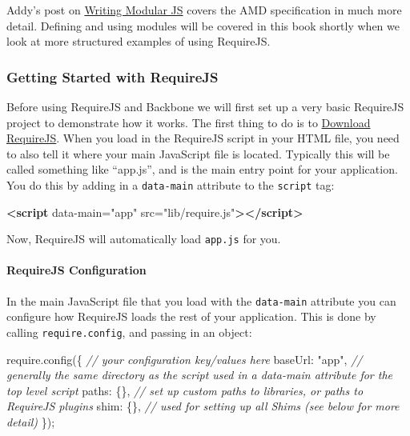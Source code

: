 \documentclass[9pt]{book}
\newenvironment{Shaded}{}{}
\newcommand{\KeywordTok}[1]{\textcolor[rgb]{0.00,0.44,0.13}{\textbf{{#1}}}}
\newcommand{\DataTypeTok}[1]{\textcolor[rgb]{0.56,0.13,0.00}{{#1}}}
\newcommand{\StringTok}[1]{\textcolor[rgb]{0.25,0.44,0.63}{{#1}}}
\newcommand{\CommentTok}[1]{\textcolor[rgb]{0.38,0.63,0.69}{\textit{{#1}}}}
\newcommand{\OtherTok}[1]{\textcolor[rgb]{0.00,0.44,0.13}{{#1}}}
\newcommand{\FunctionTok}[1]{\textcolor[rgb]{0.02,0.16,0.49}{{#1}}}
\newcommand{\NormalTok}[1]{{#1}}
\begin{document}
Addy's post on \href{http://addyosmani.com/writing-modular-js/}{Writing
Modular JS} covers the AMD specification in much more detail. Defining
and using modules will be covered in this book shortly when we look at
more structured examples of using RequireJS.

\subsubsection{Getting Started with
RequireJS}\label{getting-started-with-requirejs}

Before using RequireJS and Backbone we will first set up a very basic
RequireJS project to demonstrate how it works. The first thing to do is
to \href{http://requirejs.org/docs/download.html\#requirejs}{Download
RequireJS}. When you load in the RequireJS script in your HTML file, you
need to also tell it where your main JavaScript file is located.
Typically this will be called something like ``app.js'', and is the main
entry point for your application. You do this by adding in a
\texttt{data-main} attribute to the \texttt{script} tag:

\begin{Shaded}
\begin{Highlighting}[]
\KeywordTok{<script}\OtherTok{ data-main=}\StringTok{"app"}\OtherTok{ src=}\StringTok{"lib/require.js"}\KeywordTok{></script>}
\end{Highlighting}
\end{Shaded}

Now, RequireJS will automatically load \texttt{app.js} for you.

\paragraph{RequireJS Configuration}\label{requirejs-configuration}

In the main JavaScript file that you load with the \texttt{data-main}
attribute you can configure how RequireJS loads the rest of your
application. This is done by calling \texttt{require.config}, and
passing in an object:

\begin{Shaded}
\begin{Highlighting}[]
\OtherTok{require}\NormalTok{.}\FunctionTok{config}\NormalTok{(\{}
    \CommentTok{// your configuration key/values here}
    \DataTypeTok{baseUrl}\NormalTok{: }\StringTok{"app"}\NormalTok{, }\CommentTok{// generally the same directory as the script used in a data-main attribute for the top level script}
    \DataTypeTok{paths}\NormalTok{: \{\}, }\CommentTok{// set up custom paths to libraries, or paths to RequireJS plugins}
    \DataTypeTok{shim}\NormalTok{: \{\}, }\CommentTok{// used for setting up all Shims (see below for more detail)}
\NormalTok{\});}
\end{Highlighting}
\end{Shaded}
\end{document}
